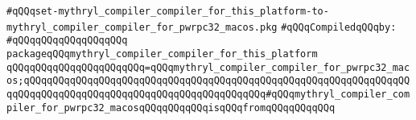 \label{src/lib/core/mythryl-compiler-compiler/set-mythryl_compiler_compiler_for_this_platform-to-mythryl_compiler_compiler_for_pwrpc32_macos.pkg}
\verb|#qQQqset-mythryl_compiler_compiler_for_this_platform-to-mythryl_compiler_compiler_for_pwrpc32_macos.pkg|\newline
\newline
\verb|#qQQqCompiledqQQqby:|\newline
\verb|#qQQqqQQqqQQqqQQqqQQq|\newline
\newline
\verb|packageqQQqmythryl_compiler_compiler_for_this_platform|\newline
\verb|qQQqqQQqqQQqqQQqqQQqqQQq=qQQqmythryl_compiler_compiler_for_pwrpc32_macos;qQQqqQQqqQQqqQQqqQQqqQQqqQQqqQQqqQQqqQQqqQQqqQQqqQQqqQQqqQQqqQQqqQQqqQQqqQQqqQQqqQQqqQQqqQQqqQQqqQQqqQQqqQQqqQQq#qQQqmythryl_compiler_compiler_for_pwrpc32_macosqQQqqQQqqQQqisqQQqfromqQQqqQQqqQQq|\newline

